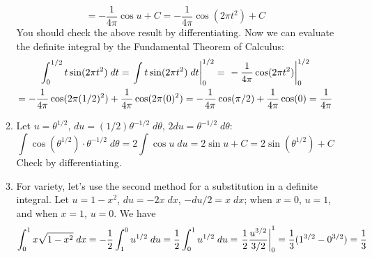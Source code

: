 \documentclass{article}
\begin{document}
\begin{enumerate}
\begin{enumerate}
\begin{equation*}
      = -\frac{1}{4\pi} \cos u + C
      = -\frac{1}{4\pi} \cos (2\pi t^2) + C
    \end{equation*}
    You should check the above result by differentiating.  Now we can
    evaluate the definite integral by the Fundamental Theorem of Calculus:
    \begin{multline*} 
      \int_0^{1/2} t\sin (2\pi t^2) \; dt
      = \left. \int t\sin(2\pi t^2) \; dt \right|_{0}^{1/2}
      = \left. \vphantom{\int} -\frac{1}{4\pi} \cos (2\pi t^2) \right|_0^{1/2}
      \\
      = -\frac{1}{4\pi} \cos (2\pi(1/2)^2) 
      + \frac{1}{4\pi} \cos (2\pi(0)^2)
      = -\frac{1}{4\pi} \cos(\pi/2) + \frac{1}{4\pi} \cos(0)
      = \frac{1}{4\pi}
    \end{multline*}
  \item %
    Let $u=\theta^{1/2}$, $du = (1/2) \theta^{-1/2} \; d\theta$,
    $2du = \theta^{-1/2} \; d\theta$:
    \begin{equation*}
      \int \cos(\theta^{1/2}) \cdot \theta^{-1/2} \; d\theta
      = 2 \int \cos u \; du
      = 2 \sin u + C
      = 2 \sin(\theta^{1/2}) + C
    \end{equation*}
    Check by differentiating.
  \item %
    For variety, let's use the second method for a substitution in a 
    definite integral.  Let $u=1-x^2$, $du=-2x \;dx$, $-du/2=x\; dx$;
    when $x=0$, $u=1$, and when $x=1$, $u=0$.  We have
    \begin{equation*}
      \int_0^1 x \sqrt{1-x^2} \; dx
      = -\frac{1}{2} \int_1^0 u^{1/2} \; du
      = \frac{1}{2} \int_0^1 u^{1/2} \; du
      = \left. \vphantom{\int} \frac{1}{2} \frac{u^{3/2}}{3/2} \right|_{0}^1
      = \frac{1}{3} (1^{3/2}-0^{3/2}) = \frac{1}{3}
    \end{equation*}
  \end{enumerate}
\end{enumerate}
\end{document}

